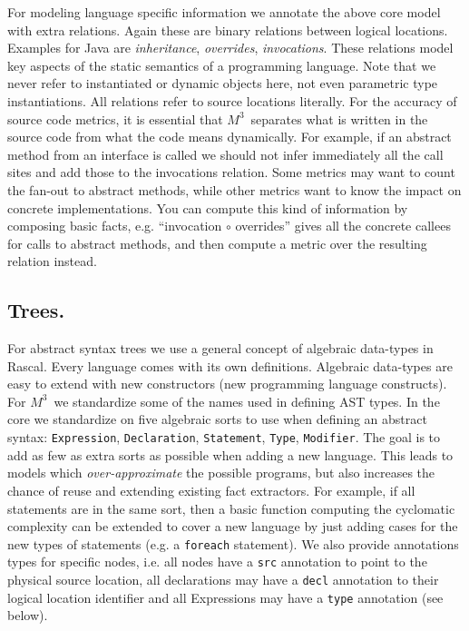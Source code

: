 \documentclass[conference]{IEEEtran}
\newcommand{\mthree}{\ensuremath{M^3}\xspace}
\begin{document}
For modeling language specific information we annotate the above core model
with extra relations. Again these are binary relations between logical
locations. Examples for Java are \emph{inheritance}, \emph{overrides},
\emph{invocations}. These relations model key aspects of the static semantics
of a programming language. Note that we never refer to instantiated or dynamic
objects here, not even parametric type instantiations. All relations refer to
source locations literally. For the accuracy of source code metrics, it is
essential that \mthree\  separates what is written in the source code from
what the code means dynamically. For example, if an abstract method from an
interface is called we should not infer immediately all the call sites and add
those to the invocations relation. Some metrics may want to count the fan-out
to abstract methods, while other metrics want to know the impact on concrete
implementations. You can compute this kind of information by composing basic
facts, e.g. ``invocation $\circ$ overrides'' gives all the concrete callees
for calls to abstract methods, and then compute a metric over the resulting
relation instead.

\subsection{Trees.} For abstract syntax trees we use a general concept of
algebraic data-types in Rascal. Every language comes with its own definitions.
Algebraic data-types are easy to extend with new constructors (new programming
language constructs). For \mthree\ we standardize some of the names used in
defining AST types. In the core we standardize on five algebraic sorts to use
when defining an abstract syntax: \texttt{Expression}, \texttt{Declaration},
\texttt{Statement}, \texttt{Type}, \texttt{Modifier}. The goal is to add as
few as extra sorts as possible when adding a new language. This leads to
models which \emph{over-approximate} the possible programs, but also increases
the chance of reuse and extending existing fact extractors. For example, if
all statements are in the same sort, then a basic function computing the
cyclomatic complexity can be extended to cover a new language by just adding
cases for the new types of statements (e.g. a \texttt{foreach} statement). We
also provide annotations types for specific nodes, i.e. all nodes have a
\texttt{src} annotation to point to the physical source location, all
declarations may have a \texttt{decl} annotation to their logical location
identifier and all Expressions may have a \texttt{type} annotation (see
below).
\end{document}
